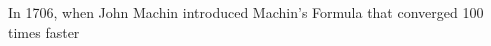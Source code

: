 \documentclass[preview]{standalone}
\begin{document}
\begin{center}
In 1706, when John Machin introduced Machin's Formula that converged 100 times faster
\end{center}
\end{document}
